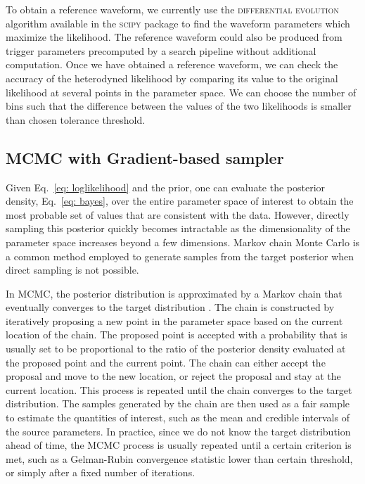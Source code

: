 \documentclass[twocolumn]{aastex631}
\newcommand{\te}[1]{\textbf{\color{pyRed}(TE: #1)}}
\begin{document}

To obtain a reference waveform, we currently use the \textsc{differential
evolution} algorithm \citep{Storn1997DifferentialE} available in the
\textsc{scipy} package \citep{2020SciPy-NMeth} to find the waveform parameters
which maximize the likelihood.  The reference waveform could also be produced
from trigger parameters precomputed by a search pipeline without additional
computation. Once we have obtained a reference waveform, we can check the accuracy
of the heterodyned likelihood by comparing its value to the original likelihood
at several points in the parameter space. We can choose the number of bins such
that the difference between the values of the two likelihoods is smaller than
chosen tolerance threshold.

\subsection{MCMC with Gradient-based sampler}
\label{sec:gradient}

Given Eq.~\eqref{eq: loglikelihood} and the prior, one can evaluate the
posterior density, Eq.~\eqref{eq: bayes}, over the entire parameter space of
interest to obtain the most probable set of values that are consistent with the
data. However, directly sampling this posterior quickly becomes intractable as
the dimensionality of the parameter space increases beyond a few dimensions.
Markov chain Monte Carlo \citep{gelmanbda04} is a common method employed to
generate samples from the target posterior when direct sampling is not
possible.

In MCMC, the posterior distribution is approximated by a Markov chain that
eventually converges to the target distribution \citep{10.1214/aos/1176325750}.
The chain is constructed by iteratively proposing a new point in the
parameter space based on the current location of the chain. The proposed point
is accepted with a probability that is usually set to be proportional to the
ratio of the posterior density evaluated at the proposed point and the current
point. The chain can either accept the proposal and move to the new location,
or reject the proposal and stay at the current location. This process is
repeated until the chain converges to the target distribution. The samples
generated by the chain are then used as a fair sample to estimate the
quantities of interest, such as the mean and credible intervals of the source
parameters. In practice, since we do not know the target distribution ahead of
time, the MCMC process is usually repeated until a certain criterion is met,
such as a Gelman-Rubin convergence statistic \citep{10.2307/2246093} lower than
certain threshold, or simply after a fixed number of iterations.
\end{document}
